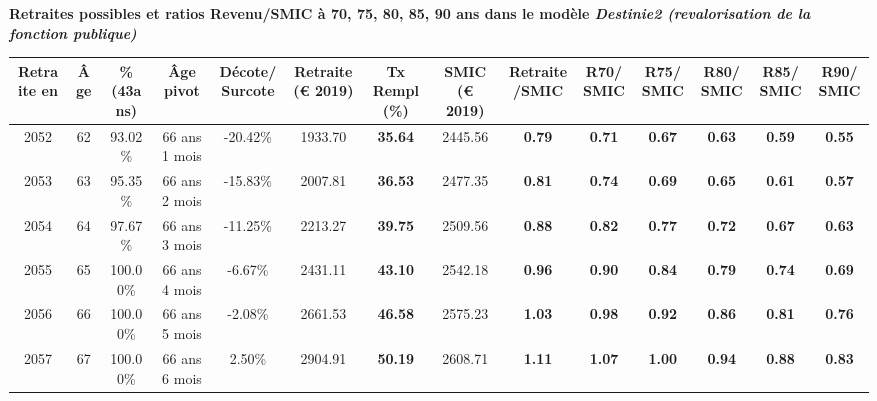  \vspace{0.1cm} 
{\bf \noindent Retraites possibles et ratios Revenu/SMIC à 70, 75, 80, 85, 90 ans dans le modèle \emph{Destinie2 (revalorisation de la fonction publique)}}  
 
\begin{adjustbox}{max width=\textwidth} 
\begin{tabular}[htb]{|c|c||c|c|c||c|c||c|c||c|c|c|c|c|} 
\hline 
 Retraite en &  Âge &  \%(43ans) &  Âge pivot &  Décote/Surcote &  Retraite (\euro{} 2019) &  Tx Rempl(\%) &  SMIC (\euro{} 2019) &  Retraite/SMIC &  R70/SMIC &  R75/SMIC &  R80/SMIC &  R85/SMIC &  R90/SMIC \\ 
\hline \hline 
 2052 &  62 &  93.02\% &  66 ans 1 mois &  -20.42\% &  1933.70 &  {\bf 35.64} &  2445.56 &  {\bf {\color{red} 0.79}} &  {\bf {\color{red} 0.71}} &  {\bf {\color{red} 0.67}} &  {\bf {\color{red} 0.63}} &  {\bf {\color{red} 0.59}} &  {\bf {\color{red} 0.55}} \\ 
\hline 
 2053 &  63 &  95.35\% &  66 ans 2 mois &  -15.83\% &  2007.81 &  {\bf 36.53} &  2477.35 &  {\bf {\color{red} 0.81}} &  {\bf {\color{red} 0.74}} &  {\bf {\color{red} 0.69}} &  {\bf {\color{red} 0.65}} &  {\bf {\color{red} 0.61}} &  {\bf {\color{red} 0.57}} \\ 
\hline 
 2054 &  64 &  97.67\% &  66 ans 3 mois &  -11.25\% &  2213.27 &  {\bf 39.75} &  2509.56 &  {\bf {\color{red} 0.88}} &  {\bf {\color{red} 0.82}} &  {\bf {\color{red} 0.77}} &  {\bf {\color{red} 0.72}} &  {\bf {\color{red} 0.67}} &  {\bf {\color{red} 0.63}} \\ 
\hline 
 2055 &  65 &  100.00\% &  66 ans 4 mois &  -6.67\% &  2431.11 &  {\bf 43.10} &  2542.18 &  {\bf {\color{red} 0.96}} &  {\bf {\color{red} 0.90}} &  {\bf {\color{red} 0.84}} &  {\bf {\color{red} 0.79}} &  {\bf {\color{red} 0.74}} &  {\bf {\color{red} 0.69}} \\ 
\hline 
 2056 &  66 &  100.00\% &  66 ans 5 mois &  -2.08\% &  2661.53 &  {\bf 46.58} &  2575.23 &  {\bf 1.03} &  {\bf {\color{red} 0.98}} &  {\bf {\color{red} 0.92}} &  {\bf {\color{red} 0.86}} &  {\bf {\color{red} 0.81}} &  {\bf {\color{red} 0.76}} \\ 
\hline 
 2057 &  67 &  100.00\% &  66 ans 6 mois &  2.50\% &  2904.91 &  {\bf 50.19} &  2608.71 &  {\bf 1.11} &  {\bf 1.07} &  {\bf 1.00} &  {\bf {\color{red} 0.94}} &  {\bf {\color{red} 0.88}} &  {\bf {\color{red} 0.83}} \\ 
\hline 
\hline 
\end{tabular} 
\end{adjustbox} 
 
